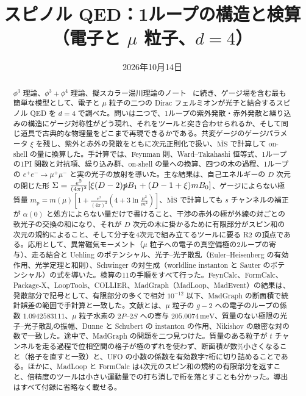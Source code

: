 \documentclass[a4paper,10pt]{ltjsarticle}
\title{スピノル QED：1ループの構造と検算（電子と $\mu$ 粒子、$d=4$）}
\author{}
\date{2026年10月14日}
\newcommand{\MSbar}{\overline{\mathrm{MS}}}
\begin{document}
\maketitle

\begin{abstract}
$\phi^3$ 理論、$\phi^3+\phi^4$ 理論、擬スカラー湯川理論のノート~\cite{phi3note,phi34note,yukawanote} に続き、ゲージ場を含む最も簡単な模型として、電子と $\mu$ 粒子の二つの Dirac フェルミオンが光子と結合するスピノル QED を $d=4$ で調べた。問いは二つで、1ループの紫外発散・赤外発散と繰り込みの構造にゲージ対称性がどう現れ、それをツールと突き合わせられるか、そして同じ道具で古典的な物理量をどこまで再現できるかである。共変ゲージのゲージパラメータ $\xi$ を残し、紫外と赤外の発散をともに次元正則化で扱い、$\MSbar$ で計算して on-shell の量に換算した。手計算では、Feynman 則、Ward--Takahashi 恒等式、1ループの1PI 関数と対抗項、繰り込み群、on-shell の量への換算、四つの木の過程、1ループの $e^+e^-\to\mu^+\mu^-$ と実の光子の放射を導いた。主な結果は、自己エネルギーの $D$ 次元の閉じた形 $\Sigma=\frac{e^2}{(4\pi)^2}[\xi(D-2)\slashed pB_1+(D-1+\xi)mB_0]$、ゲージによらない極質量 $m_{\mathrm p}=m(\mu)[1+\frac{e^2}{(4\pi)^2}(4+3\ln\frac{\mu^2}{m^2})]$、$\MSbar$ で計算しても $s$ チャンネルの補正が $\alpha(0)$ と処方によらない量だけで書けること、干渉の赤外の極が外線の対ごとの軟光子の交換の和になり、それが $D$ 次元の木に掛かるために有限部分がスピン和の次元の規約によること、そして分子を4次元で組み立てるツールに要る R2 の頂点である。応用として、異常磁気モーメント（$\mu$ 粒子への電子の真空偏極の2ループの寄与）、走る結合と Uehling のポテンシャル、光子--光子散乱（Euler--Heisenberg の有効作用、光学定理と和則）、Schwinger の対生成（worldline instanton と Sauter のポテンシャル）の式を導いた。検算の11の手順をすべて行った。FeynCalc、FormCalc、Package-X、LoopTools、COLLIER、MadGraph（MadLoop、MadEvent）の結果は、発散部分で記号として、有限部分の多くで相対 $10^{-12}$ 以下、MadGraph の断面積で統計誤差の範囲で手計算と一致した。文献とは、$\mu$ 粒子の $g-2$ への電子のループの係数 $1.0942583111$、$\mu$ 粒子水素の $2P$--$2S$ への寄与 $205.0074\,\mathrm{meV}$、質量のない極限の光子--光子散乱の振幅、Dunne と Schubert の instanton の作用、Nikishov の厳密な対の数で一致した。途中で、MadGraph の問題を二つ見つけた。質量のある粒子が $t$ チャンネルを走る過程で位相空間の格子が極のずれを使わず、断面積が数\%小さくなること（格子を直すと一致）と、UFO の小数の係数を有効数字7桁に切り詰めることである。ほかに、MadLoop と FormCalc は4次元のスピン和の規約の有限部分を返すこと、倍精度のツールは小さい運動量での打ち消しで桁を落とすことも分かった。導出はすべて付録に省略なく載せる。
\end{abstract}
\end{document}
